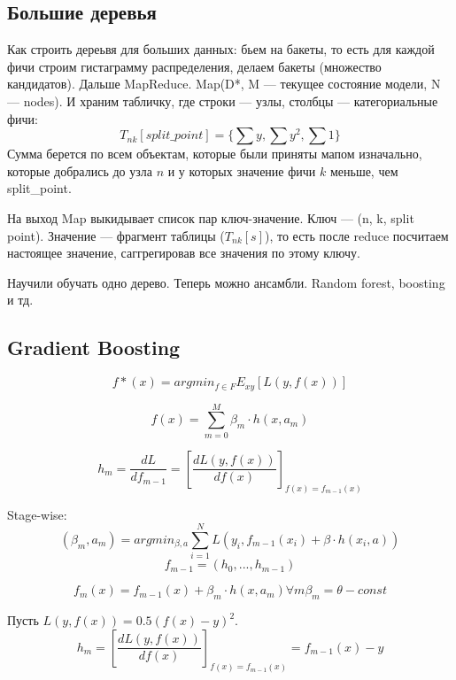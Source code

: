 \documentclass[12pt]{article}
\begin{document}
\subsection{Большие деревья}
\quad Как строить дереьвя для больших данных: бьем на бакеты, то есть для каждой фичи строим гистаграмму распределения, делаем бакеты (множество кандидатов). Дальше MapReduce. Map(D*, M --- текущее состояние модели, N --- nodes). И храним табличку, где строки --- узлы, столбцы --- категориальные фичи:
$$T_{nk}[split\_point] = \{\sum y, \sum y^2, \sum 1\}$$
Сумма берется по всем объектам, которые были приняты мапом изначально, которые добрались до узла $n$ и у которых значение фичи $k$ меньше, чем split\_point.

На выход Map выкидывает список пар ключ-значение. Ключ --- (n, k, split point). Значение --- фрагмент таблицы ($T_{nk}[s]$), то есть после reduce посчитаем настоящее значение, саггрегировав все значения по этому ключу.

Научили обучать одно дерево. Теперь можно ансамбли. Random forest, boosting и тд.

\subsection{Gradient Boosting}
$$f*(x) = argmin_{f\in F} E_{xy}[L(y, f(x))]$$

$$f(x) = \sum_{m=0}^{M}{\beta_m \cdot h(x, a_m)}$$

$$h_m = \frac{dL}{df_{m-1}} = [\frac{dL(y, f(x))}{df(x)}]_{f(x)=f_{m-1}(x)}$$

Stage-wise:
$$(\beta_m, a_m) = argmin_{\beta, a} \sum_{i=1}^N{L(y_i, f_{m-1}(x_i) + \beta \cdot h(x_i, a))}$$
$$f_{m-1}=(h_0, ..., h_{m-1})$$

$$f_m(x)=f_{m-1}(x) + \beta_m \cdot h(x, a_m) \forall m \beta_m = \theta-const$$

Пусть $L(y, f(x))=0.5(f(x)-y)^2$.
$$h_m=[\frac{dL(y,f(x))}{df(x)}]_{f(x) = f_{m-1}(x)} = f_{m-1}(x) - y$$
\end{document}
